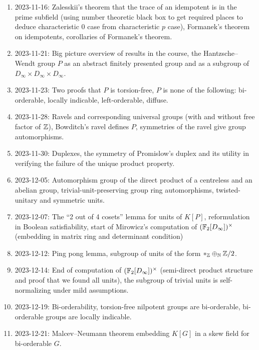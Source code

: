 \begin{enumerate}
\item
2023-11-16: Zalesskii's theorem that the trace of an idempotent is in the prime subfield (using number theoretic black box to get required places to deduce characteristic $0$ case from characteristic $p$ case), Formanek's theorem on idempotents, corollaries of Formanek's theorem.

\item
2023-11-21: Big picture overview of results in the course, the Hantzsche--Wendt group $P$ as an abstract finitely presented group and as a subgroup of $D_\infty \times D_\infty \times D_\infty$.

\item
2023-11-23: Two proofs that $P$ is torsion-free, $P$ is none of the following: bi-orderable, locally indicable, left-orderable, diffuse.

\item
2023-11-28: Ravels and corresponding universal groups (with and without free factor of $\mathbb{Z}$), Bowditch's ravel defines $P$, symmetries of the ravel give group automorphisms.

\item
2023-11-30: Duplexes, the symmetry of Promislow's duplex and its utility in verifying the failure of the unique product property.

\item
2023-12-05: Automorphism group of the direct product of a centreless and an abelian group, trivial-unit-preserving group ring automorphisms, twisted-unitary and symmetric units.

\item
2023-12-07: The ``2 out of 4 cosets'' lemma for units of $K[P]$, reformulation in Boolean satisfiability, start of Mirowicz's computation of $(\mathbb{F}_2[D_\infty])^\times$ (embedding in matrix ring and determinant condition)

\item
2023-12-12: Ping pong lemma, subgroup of units of the form $\ast_{\mathbb{Z}} \oplus_{\mathbb{N}} \mathbb{Z} / 2$.

\item
2023-12-14: End of computation of $(\mathbb{F}_2[D_\infty])^\times$ (semi-direct product structure and proof that we found all units), the subgroup of trivial units is self-normalizing under mild assumptions.

\item
2023-12-19: Bi-orderability, torsion-free nilpotent groups are bi-orderable, bi-orderable groups are locally indicable.

\item
2023-12-21: Malcev--Neumann theorem embedding $K[G]$ in a skew field for bi-orderable $G$.


\end{enumerate}
